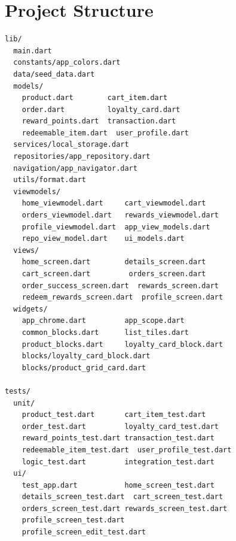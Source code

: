 \section{Project Structure}

\begin{lstlisting}[language={},caption={Directory layout}]
lib/
  main.dart
  constants/app_colors.dart
  data/seed_data.dart
  models/
    product.dart        cart_item.dart
    order.dart          loyalty_card.dart
    reward_points.dart  transaction.dart
    redeemable_item.dart  user_profile.dart
  services/local_storage.dart
  repositories/app_repository.dart
  navigation/app_navigator.dart
  utils/format.dart
  viewmodels/
    home_viewmodel.dart     cart_viewmodel.dart
    orders_viewmodel.dart   rewards_viewmodel.dart
    profile_viewmodel.dart  app_view_models.dart
    repo_view_model.dart    ui_models.dart
  views/
    home_screen.dart        details_screen.dart
    cart_screen.dart         orders_screen.dart
    order_success_screen.dart  rewards_screen.dart
    redeem_rewards_screen.dart  profile_screen.dart
  widgets/
    app_chrome.dart         app_scope.dart
    common_blocks.dart      list_tiles.dart
    product_blocks.dart     loyalty_card_block.dart
    blocks/loyalty_card_block.dart
    blocks/product_grid_card.dart

tests/
  unit/
    product_test.dart       cart_item_test.dart
    order_test.dart         loyalty_card_test.dart
    reward_points_test.dart transaction_test.dart
    redeemable_item_test.dart  user_profile_test.dart
    logic_test.dart         integration_test.dart
  ui/
    test_app.dart           home_screen_test.dart
    details_screen_test.dart  cart_screen_test.dart
    orders_screen_test.dart rewards_screen_test.dart
    profile_screen_test.dart
    profile_screen_edit_test.dart
\end{lstlisting}
